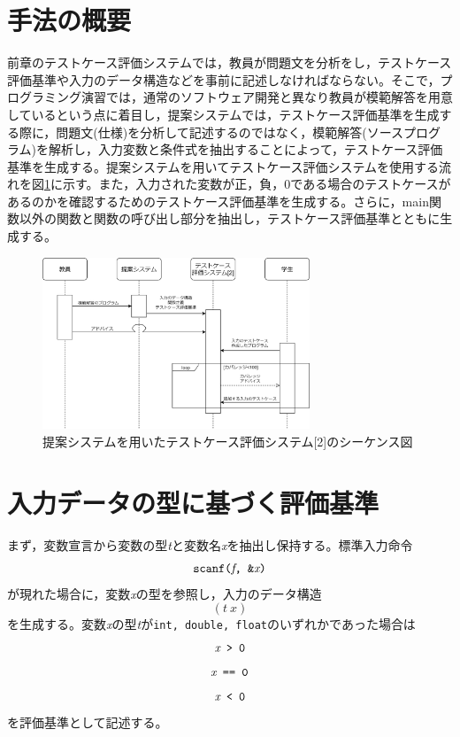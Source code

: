 \documentclass{tpu-sotu}
\begin{document}
\section{手法の概要}
前章のテストケース評価システムでは，教員が問題文を分析をし，テストケース評価基準や入力のデータ構造などを事前に記述しなければならない。そこで，プログラミング演習では，通常のソフトウェア開発と異なり教員が模範解答を用意しているという点に着目し，提案システムでは，テストケース評価基準を生成する際に，問題文(仕様)を分析して記述するのではなく，模範解答(ソースプログラム)を解析し，入力変数と条件式を抽出することによって，テストケース評価基準を生成する。提案システムを用いてテストケース評価システムを使用する流れを図\ref{c1}に示す。また，入力された変数が正，負，0である場合のテストケースがあるのかを確認するためのテストケース評価基準を生成する。さらに，main関数以外の関数と関数の呼び出し部分を抽出し，テストケース評価基準とともに生成する。
\begin{figure}[h]
  \centering
  \includegraphics[width=80mm]{シーケンス図2.png}
  \caption{提案システムを用いたテストケース評価システム[2]のシーケンス図}
  \label{c1}
\end{figure}
\section{入力データの型に基づく評価基準}
まず，変数宣言から変数の型{\it t}と変数名{\it x}を抽出し保持する。標準入力命令\\
\[ 
\mbox{{\tt {scanf({\it f}, \&{\it x})}}}
\]
が現れた場合に，変数{\it x}の型を参照し，入力のデータ構造\\
\[
(t\:x)
\]
を生成する。変数{\it x}の型{\it t}が{\tt int, double, float}のいずれかであった場合は\\
\[ 
\mbox{\tt{{\it x} > 0}} 
\]
\[
\mbox{\tt{{\it x} == 0}}
\]
\[
\mbox{\tt{{\it x} < 0}}
\]
を評価基準として記述する。
\end{document}
